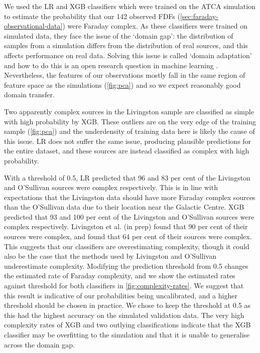     We used the LR and XGB classifiers which were trained on the ATCA simulation to estimate the probability that our 142 observed FDFs (\autoref{sec:faraday-observational-data}) were Faraday complex. As these classifiers were trained on simulated data, they face the issue of the `domain gap': the distribution of samples from a simulation differs from the distribution of real sources, and this affects performance on real data. Solving this issue is called `domain adaptation' and how to do this is an open research question in machine learning \citep{zhang2019transfer,pan10transfer}. Nevertheless, the features of our observations mostly fall in the same region of feature space as the simulations (\autoref{fig:pca}) and so we expect reasonably good domain transfer.

    Two apparently complex sources in the Livingston sample are classified as simple with high probability by XGB. These outliers are on the very edge of the training sample (\autoref{fig:pca}) and the underdensity of training data here is likely the cause of this issue. LR does not suffer the same issue, producing plausible predictions for the entire dataset, and these sources are instead classified as complex with high probability.

    With a threshold of 0.5, LR predicted that 96 and 83 per cent of the Livingston and O'Sullivan sources were complex respectively. This is in line with expectations that the Livingston data should have more Faraday complex sources than the O'Sullivan data due to their location near the Galactic Centre. XGB predicted that 93 and 100 per cent of the Livingston and O'Sullivan sources were complex respectively. Livingston et al. (in prep) found that 90 per cent of their sources were complex, and \citet{osullivan_broad-band_2017} found that 64 per cent of their sources were complex. This suggests that our classifiers are overestimating complexity, though it could also be the case that the methods used by Livingston and O'Sullivan underestimate complexity. Modifying the prediction threshold from 0.5 changes the estimated rate of Faraday complexity, and we show the estimated rates against threshold for both classifiers in \autoref{fig:complexity-rates}. We suggest that this result is indicative of our probabilities being uncalibrated, and a higher threshold should be chosen in practice. We chose to keep the threshold at 0.5 as this had the highest accuracy on the simulated validation data. The very high complexity rates of XGB and two outlying classifications indicate that the XGB classifier may be overfitting to the simulation and that it is unable to generalise across the domain gap.

